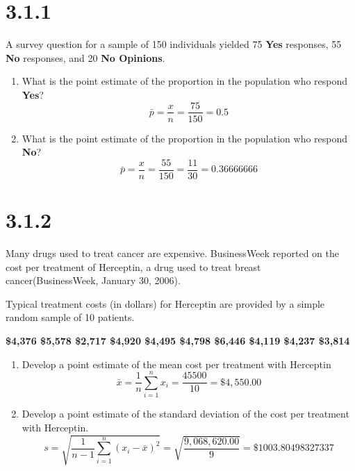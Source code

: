 \documentclass{article}
\begin{document}
\section*{3.1.1}
A survey question for a sample of 150 individuals yielded 75 \textbf{Yes} responses, 55 \textbf{No} responses, and 20 \textbf{No Opinions}.
\begin{enumerate}
  \item What is the point estimate of the proportion in the population who respond \textbf{Yes}?
  \begin{equation*}
    \bar{p} = \frac{x}{n} = \frac{75}{150} = 0.5
  \end{equation*}
  \item What is the point estimate of the proportion in the population who respond \textbf{No}?
  \begin{equation*}
    \bar{p} = \frac{x}{n} = \frac{55}{150} = \frac{11}{30} = 0.36666666
  \end{equation*}
\end{enumerate}

\section*{3.1.2}
Many drugs used to treat cancer are expensive. BusinessWeek reported on the cost per treatment of Herceptin, a drug used to treat breast cancer(BusinessWeek, January 30, 2006).

Typical treatment costs (in dollars) for Herceptin are provided by a simple random sample of 10 patients.
\begin{center}
  \textbf{\$4,376 \$5,578 \$2,717 \$4,920 \$4,495 \$4,798 \$6,446 \$4,119 \$4,237 \$3,814}
\end{center}

\begin{enumerate}
  \item Develop a point estimate of the mean cost per treatment with Herceptin
  \begin{equation*}
    \bar{x} = \frac{1}{n} \sum_{i=1}^{n} x_{i} = \frac{45500}{10} = \$4,550.00
  \end{equation*}
  \item Develop a point estimate of the standard deviation of the cost per treatment with Herceptin.
  \begin{equation*}
    s = \sqrt{\frac{1}{n - 1} \sum_{i=1}^{n}(x_{i} - \bar{x})^{2}} = \sqrt{\frac{9,068,620.00}{9}}= \$1003.80498327337
  \end{equation*}
\end{enumerate}
\end{document}
